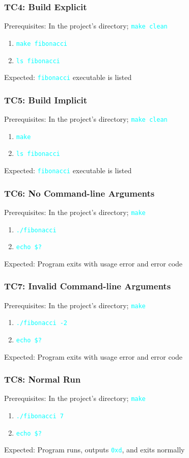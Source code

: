 \documentclass{article}
\newcommand{\code}[1]{\textcolor{cyan}{\texttt{#1}}}
\begin{document}
\subsubsection{TC4: Build Explicit}
Prerequisites: In the project's directory; \code{make clean}
\begin{enumerate}
	\item \code{make fibonacci}
	\item \code{ls fibonacci}
\end{enumerate}
Expected: \code{fibonacci} executable is listed


\subsubsection{TC5: Build Implicit}
Prerequisites: In the project's directory; \code{make clean}
\begin{enumerate}
	\item \code{make}
	\item \code{ls fibonacci}
\end{enumerate}
Expected: \code{fibonacci} executable is listed


\subsubsection{TC6: No Command-line Arguments}
Prerequisites: In the project's directory; \code{make}
\begin{enumerate}
	\item \code{./fibonacci}
	\item \code{echo \$?}
\end{enumerate}
Expected: Program exits with usage error and error code


\subsubsection{TC7: Invalid Command-line Arguments}
Prerequisites: In the project's directory; \code{make}
\begin{enumerate}
	\item \code{./fibonacci -2}
	\item \code{echo \$?}
\end{enumerate}
Expected: Program exits with usage error and error code


\subsubsection{TC8: Normal Run}
Prerequisites: In the project's directory; \code{make}
\begin{enumerate}
	\item \code{./fibonacci 7}
	\item \code{echo \$?}
\end{enumerate}
Expected: Program runs, outputs \code{0xd}, and exits normally
\end{document}
